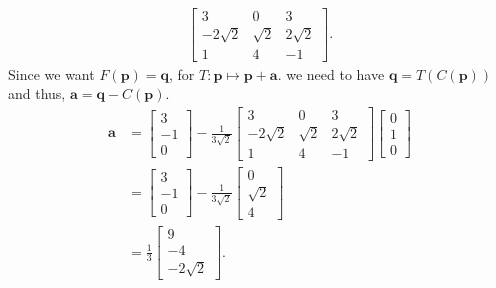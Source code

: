 \documentclass[12 pt, letterpaper]{hmcpset}
\begin{document}
\begin{solution}
\[\begin{split}
\begin{bmatrix}
				  3 & 0 & 3 \\
				  -2 \sqrt 2 & \sqrt 2 & 2 \sqrt 2 \\
				  1 & 4 & -1
			  \end{bmatrix}.
		\end{split}
	\]
	Since we want $F(\mathbf{p}) = \mathbf{q}$, for $T : \mathbf{p} \mapsto \mathbf{p} + \mathbf{a}$. we need to have $\mathbf{q} = T(C(\mathbf{p}))$ and thus, $\mathbf{a} = \mathbf{q} - C(\mathbf{p})$.
	\[
		\begin{split}
			\mathbf{a} & = \begin{bmatrix}
				3 \\
				-1 \\
				0
			\end{bmatrix} - \frac{1}{3 \sqrt 2} \begin{bmatrix}
				  3 & 0 & 3 \\
				  -2 \sqrt 2 & \sqrt 2 & 2 \sqrt 2 \\
				  1 & 4 & -1
			  \end{bmatrix} \begin{bmatrix}
			  	0 \\
				1 \\ 
				0
			  \end{bmatrix} \\
				   & = \begin{bmatrix}
				   	3 \\
					-1 \\
					0
				   \end{bmatrix} - \frac{1}{3 \sqrt 2} \begin{bmatrix}
				   	0 \\
					\sqrt 2 \\
					4
				   \end{bmatrix} \\
				   & = \frac{1}{3} \begin{bmatrix}
				   	9 \\
					- 4 \\
					-2 \sqrt 2
				   \end{bmatrix}.
		\end{split}
	\]
\end{solution}
\end{document}
